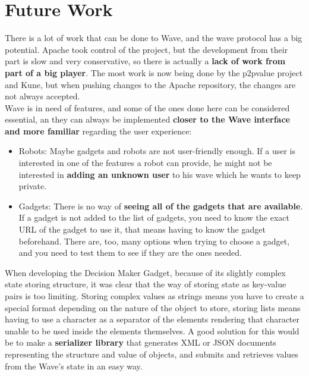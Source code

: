 \newpage
\section{Future Work}

There is a lot of work that can be done to Wave, and the wave protocol has a big potential. Apache took control of the project, but the development from their part is slow and very conservative, so there is actually a \textbf{lack of work from part of a big player}. The most work is now being done by the p2pvalue project and Kune, but when pushing changes to the Apache repository, the changes are not always accepted.\\[.2cm]
Wave is in need of features, and some of the ones done here can be considered essential, an they can always be implemented \textbf{closer to the Wave interface and more familiar} regarding the user experience:
\begin{itemize}
  \item Robots: Maybe gadgets and robots are not user-friendly enough. If a user is interested in one of the features a robot can provide, he might not be interested in \textbf{adding an unknown user} to his wave which he wants to keep private.
  \item Gadgets: There is no way of \textbf{seeing all of the gadgets that are available}. If a gadget is not added to the list of gadgets, you need to know the exact URL of the gadget to use it, that means having to know the gadget beforehand. There are, too, many options when trying to choose a gadget, and you need to test them to see if they are the ones needed.
\end{itemize}
When developing the Decision Maker Gadget, because of its slightly complex state storing structure, it was clear that the way of storing state as key-value pairs is too limiting. Storing complex values as strings means you have to create a special format depending on the nature of the object to store, storing lists means having to use a character as a separator of the elements rendering that character unable to be used inside the elements themselves. A good solution for this would be to make a \textbf{serializer library} that generates XML or JSON documents representing the structure and value of objects, and submits and retrieves values from the  Wave's state in an easy way.


